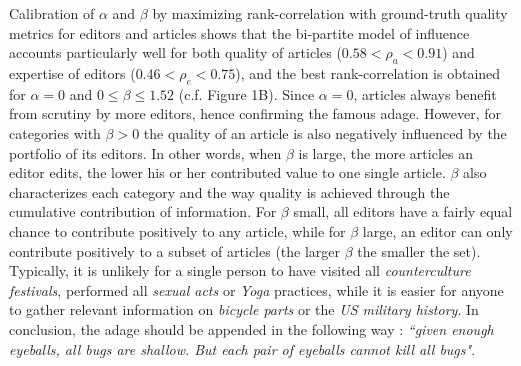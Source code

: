 \documentclass[letterpaper,9pt,a4paper]{article}
\begin{document}
Calibration of $\alpha$ and $\beta$ by maximizing rank-correlation with ground-truth quality metrics for editors \cite{geiger2013} and articles \cite{wang} shows that the bi-partite model of influence accounts particularly well for both quality of articles ($0.58 < \rho_a < 0.91$) and expertise of editors ($0.46 < \rho_e < 0.75 $), and the best rank-correlation is obtained for $\alpha= 0$ and $0 \leqslant \beta \leqslant 1.52$ (c.f. Figure 1B). Since $\alpha = 0$, articles always benefit from scrutiny by more editors, hence confirming the famous adage. However, for categories with $\beta >0$ the quality of an article is also negatively influenced by the portfolio of its editors. In other words, when $\beta$ is large, the more articles an editor edits, the lower his or her contributed value to one single article. $\beta$ also characterizes each category and the way quality is achieved through the cumulative contribution of information. For $\beta$ small, all editors have a fairly equal chance to contribute positively to any article, while for $\beta$ large, an editor can only contribute positively to a subset of articles (the larger $\beta$ the smaller the set). Typically, it is unlikely for a single person to have visited all {\it counterculture festivals}, performed all {\it sexual acts} or {\it Yoga} practices, while it is easier for anyone to gather relevant information on {\it bicycle parts} or the {\it US military history}. In conclusion, the adage should be appended in the following way : {\it ``given enough eyeballs, all bugs are shallow. But each pair of eyeballs cannot kill all bugs"}.
\end{document}
